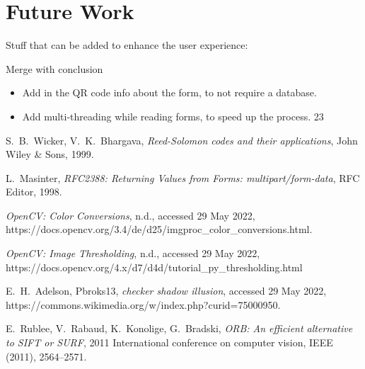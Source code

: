 \documentclass[12pt, a4paper]{report}
\begin{document}
\chapter{Future Work}

Stuff that can be added to enhance the user experience:

Merge with conclusion

\begin{itemize}
    \item Add in the QR code info about the form, to not require a database.
    \item Add multi-threading while reading forms, to speed up the process. 23
\end{itemize}

\begin{thebibliography}{99}	

S.~B.~Wicker, V.~K.~Bhargava,
\emph{Reed-Solomon codes and their applications},
John Wiley \& Sons, 1999.

L.~Masinter, 
\emph{RFC2388: Returning Values from Forms: multipart/form-data},
RFC Editor, 1998.

\emph{OpenCV: Color Conversions}, n.d., accessed 29 May 2022,  https://docs.opencv.org/3.4/de/d25/imgproc\_color\_conversions.html.

\emph{OpenCV: Image Thresholding}, n.d., accessed 29 May 2022,
https://docs.opencv.org/4.x/d7/d4d/tutorial\_py\_thresholding.html

E.~H.~Adelson, Pbroks13, \emph{checker shadow illusion}, accessed 29 May 2022, https://commons.wikimedia.org/w/index.php?curid=75000950.

E.~Rublee, V.~Rabaud, K.~Konolige, G.~Bradski,
\emph{ORB: An efficient alternative to SIFT or SURF},
	2011 International conference on computer vision, IEEE (2011),
	2564--2571.


\end{thebibliography}
\end{document}
